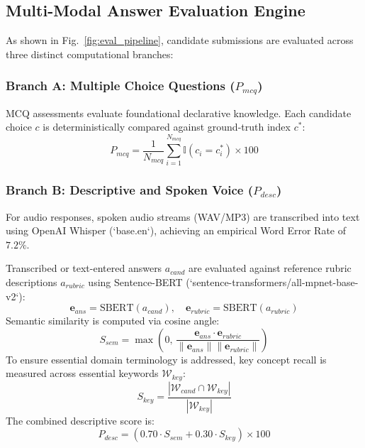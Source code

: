 \documentclass[conference]{IEEEtran}
\begin{document}
\subsection{Multi-Modal Answer Evaluation Engine}
As shown in Fig.~\ref{fig:eval_pipeline}, candidate submissions are evaluated across three distinct computational branches:

\subsubsection{Branch A: Multiple Choice Questions ($P_{mcq}$)}
MCQ assessments evaluate foundational declarative knowledge. Each candidate choice $c$ is deterministically compared against ground-truth index $c^*$:
\begin{equation}
P_{mcq} = \frac{1}{N_{mcq}} \sum_{i=1}^{N_{mcq}} \mathbb{I}(c_i = c_i^*) \times 100
\end{equation}

\subsubsection{Branch B: Descriptive and Spoken Voice ($P_{desc}$)}
For audio responses, spoken audio streams (WAV/MP3) are transcribed into text using OpenAI Whisper (`base.en`), achieving an empirical Word Error Rate of $7.2\%$. 

Transcribed or text-entered answers $a_{cand}$ are evaluated against reference rubric descriptions $a_{rubric}$ using Sentence-BERT (`sentence-transformers/all-mpnet-base-v2`):
\begin{equation}
\mathbf{e}_{ans} = \text{SBERT}(a_{cand}), \quad \mathbf{e}_{rubric} = \text{SBERT}(a_{rubric})
\end{equation}
Semantic similarity is computed via cosine angle:
\begin{equation}
S_{sem} = \max\left(0, \, \frac{\mathbf{e}_{ans} \cdot \mathbf{e}_{rubric}}{\|\mathbf{e}_{ans}\| \|\mathbf{e}_{rubric}\|}\right)
\end{equation}
To ensure essential domain terminology is addressed, key concept recall is measured across essential keywords $\mathcal{W}_{key}$:
\begin{equation}
S_{key} = \frac{|\mathcal{W}_{cand} \cap \mathcal{W}_{key}|}{|\mathcal{W}_{key}|}
\end{equation}
The combined descriptive score is:
\begin{equation}
P_{desc} = (0.70 \cdot S_{sem} + 0.30 \cdot S_{key}) \times 100
\end{equation}
\end{document}
